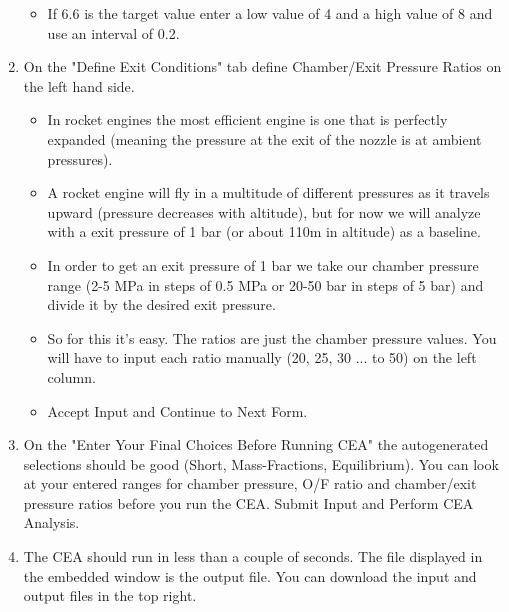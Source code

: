 \documentclass[12pt, letter paper]{article}
\begin{document}
\begin{enumerate}
\begin{itemize}
							\item If 6.6 is the target value enter a low value of 4 and a high value of 8 and use an interval of 0.2.
						\end{itemize}
					\item On the "Define Exit Conditions" tab define Chamber/Exit Pressure Ratios on the left hand side. 
						\begin{itemize}
							\item In rocket engines the most efficient engine is one that is perfectly expanded (meaning the pressure at the exit of the nozzle is at ambient pressures).
							\item A rocket engine will fly in a multitude of different pressures as it travels upward (pressure decreases with altitude),
								but for now we will analyze with a exit pressure of 1 bar (or about 110m in altitude) as a baseline.
							\item In order to get an exit pressure of 1 bar we take our chamber pressure range (2-5 MPa in steps of 0.5 MPa or 20-50 bar in steps of 5 bar) and divide it by the desired exit pressure.
							\item So for this it's easy. The ratios are just the chamber pressure values. You will have to input each ratio manually (20, 25, 30 ... to 50) on the left column.
							\item Accept Input and Continue to Next Form.
						\end{itemize}
					\item On the "Enter Your Final Choices Before Running CEA" the autogenerated selections should be good (Short, Mass-Fractions, Equilibrium). 
						You can look at your entered ranges for chamber pressure, O/F ratio and chamber/exit pressure ratios before you run the CEA.
						Submit Input and Perform CEA Analysis.
					\item The CEA should run in less than a couple of seconds. The file displayed in the embedded window is the output file. You can download the input and output files in the top right.		
				\end{enumerate}
\end{document}
